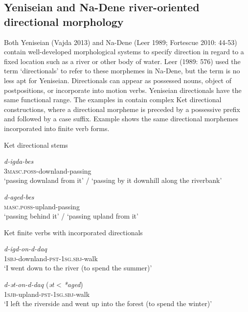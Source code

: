 \subsection{Yeniseian and Na-Dene river-oriented directional morphology}

Both Yeniseian (Vajda 2013) and Na-Dene (Leer 1989; Fortescue 2010: 44-53) contain well-developed morphological systems to specify direction in regard to a fixed location such as a river or other body of water. Leer (1989: 576) used the term ‘directionals’ to refer to these morphemes in Na-Dene, but the term is no less apt for Yeniseian. Directionals can appear as possessed nouns, object of postpositions, or incorporate into motion verbs. Yeniseian directionals have the same functional range. The examples in  contain complex Ket directional constructions, where a directional morpheme is preceded by a possessive prefix and followed by a case suffix. Example  shows the same directional morphemes incorporated into finite verb forms.


\begin{exe}
\ex Ket directional stems\label{vajda-ex1}
\begin{xlist}

\ex
\gll \textit{d-igda-bes}\\
  \textsc{3masc.poss}-downland-passing\\
\glt ‘passing downland from it’ / ‘passing by it downhill along the riverbank’

\ex
\gll \textit{d-aged-bes}\\
  \textsc{masc.poss}-upland-passing\\
\glt ‘passing behind it’ / ‘passing upland from it’

\end{xlist}
\end{exe}

\begin{exe}
\ex Ket finite verbs with incorporated directionals \label{vajda-ex2}
\begin{xlist}
\ex
\gll \textit{d-igd-on-d-daq}\\
 \textsc{1sbj}-downland-\textsc{pst-1sg.sbj}-walk \\
\glt ‘I went down to the river (to spend the summer)’


\ex
\gll \textit{d-ət-on-d-daq }(\textit{ət }{\textless}\textit{ *aged})\\
  \textsc{1sjb-}upland\textsc{{}-pst-1sg.sbj-}walk\\
\glt ‘I left the riverside and went up into the forest (to spend the winter)’
\end{xlist}
\end{exe}


